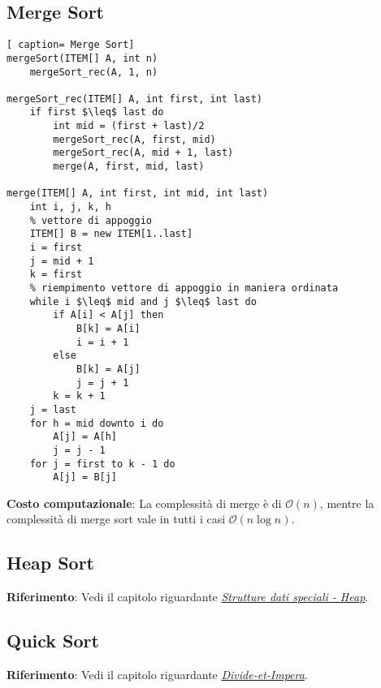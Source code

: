 \documentclass[../cheatSheetAlgoritmi.tex]{subfiles}
\begin{document}
\subsection{Merge Sort}
\begin{lstlisting}[ caption= Merge Sort]
mergeSort(ITEM[] A, int n)
	mergeSort_rec(A, 1, n)

mergeSort_rec(ITEM[] A, int first, int last)
  	if first $\leq$ last do
		int mid = (first + last)/2
		mergeSort_rec(A, first, mid)
		mergeSort_rec(A, mid + 1, last)
		merge(A, first, mid, last)

merge(ITEM[] A, int first, int mid, int last)
  	int i, j, k, h
  	% vettore di appoggio
  	ITEM[] B = new ITEM[1..last]
  	i = first
  	j = mid + 1
  	k = first
  	% riempimento vettore di appoggio in maniera ordinata
  	while i $\leq$ mid and j $\leq$ last do
		if A[i] < A[j] then
			B[k] = A[i]
			i = i + 1
		else  
			B[k] = A[j]
			j = j + 1
		k = k + 1
	j = last
  	for h = mid downto i do
  		A[j] = A[h]
  		j = j - 1
  	for j = first to k - 1 do
  		A[j] = B[j]
\end{lstlisting}
\textbf{Costo computazionale}: La complessità di merge è di $\mathcal{O}(n)$, mentre la complessità di merge sort vale in tutti i casi $\mathcal{O}(n\log{}n)$.\

\subsection{Heap Sort}
\textbf{Riferimento}: Vedi il capitolo riguardante \hyperref[sec:heap]{\emph{Strutture dati speciali - Heap}}.
\subsection{Quick Sort}
\textbf{Riferimento}: Vedi il capitolo riguardante \hyperref[sec:quicksort]{\emph{Divide-et-Impera}}.

\newpage
\end{document}
